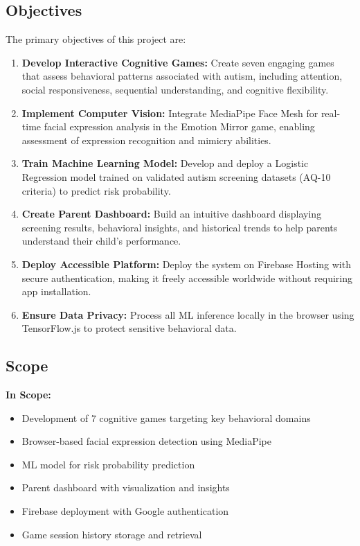 \documentclass[12pt,letterpaper]{article}
\begin{document}
\subsection{Objectives}

The primary objectives of this project are:

\begin{enumerate}
    \item \textbf{Develop Interactive Cognitive Games:} Create seven engaging games that assess behavioral patterns associated with autism, including attention, social responsiveness, sequential understanding, and cognitive flexibility.
    
    \item \textbf{Implement Computer Vision:} Integrate MediaPipe Face Mesh for real-time facial expression analysis in the Emotion Mirror game, enabling assessment of expression recognition and mimicry abilities.
    
    \item \textbf{Train Machine Learning Model:} Develop and deploy a Logistic Regression model trained on validated autism screening datasets (AQ-10 criteria) to predict risk probability.
    
    \item \textbf{Create Parent Dashboard:} Build an intuitive dashboard displaying screening results, behavioral insights, and historical trends to help parents understand their child's performance.
    
    \item \textbf{Deploy Accessible Platform:} Deploy the system on Firebase Hosting with secure authentication, making it freely accessible worldwide without requiring app installation.
    
    \item \textbf{Ensure Data Privacy:} Process all ML inference locally in the browser using TensorFlow.js to protect sensitive behavioral data.
\end{enumerate}

\subsection{Scope}

\textbf{In Scope:}
\begin{itemize}
    \item Development of 7 cognitive games targeting key behavioral domains
    \item Browser-based facial expression detection using MediaPipe
    \item ML model for risk probability prediction
    \item Parent dashboard with visualization and insights
    \item Firebase deployment with Google authentication
    \item Game session history storage and retrieval
\end{itemize}
\end{document}
